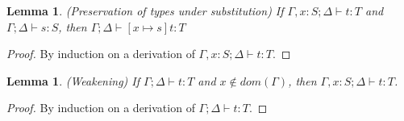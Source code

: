 \documentclass[a4paper,twoside]{article}
\newtheorem{lemma}[theorem]{Lemma}
\begin{document}
\begin{lemma}
\emph{(Preservation of types under substitution)}
\label{lem:substitution}
If $\Gamma, x : S ; \Delta \vdash t : T$ and $\Gamma ; \Delta \vdash s : S$, then $\Gamma ; \Delta \vdash [x \mapsto s]t : T$
\end{lemma}
\begin{proof}
By induction on a derivation of $\Gamma, x : S ; \Delta \vdash t : T$.
\end{proof}


\begin{lemma}
\emph{(Weakening)}
\label{lem:weak}
If $\Gamma ; \Delta \vdash t : T$ and $x \notin dom(\Gamma)$, then $\Gamma, x : S ; \Delta \vdash t : T$.
\end{lemma}
\begin{proof}
By induction on a derivation of $\Gamma ; \Delta \vdash t : T$.
\end{proof}
\end{document}
